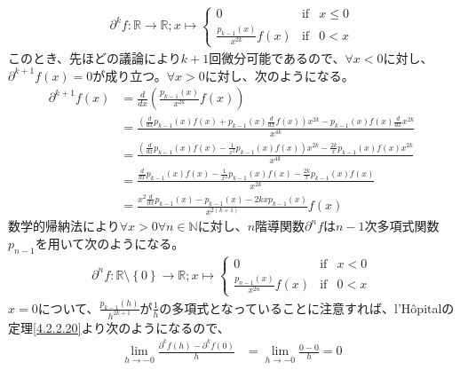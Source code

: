 \documentclass[dvipdfmx]{jsarticle}
\begin{document}
\begin{dfn}
{\begin{align*}
  \partial^k f:\mathbb{R} \rightarrow \mathbb{R} ; x \mapsto \left\{ \begin{matrix}
    0 & \mathrm{if} & x \leq 0 \\
    \frac{p_{k-1} \left(x \right) }{x^{2k }} f\left( x\right) & \mathrm{if} & 0 < x
  \end{matrix}\right. 
\end{align*}
このとき、先ほどの議論により$k+1$回微分可能であるので、$\forall x < 0 $に対し、$\partial^{k+1} f\left(x\right) =0 $が成り立つ。$\forall x >0 $に対し、次のようになる。
\begin{align*}
  \partial^{k+1} f \left(x\right) &= \frac{d}{dx} \left(\frac{p_{k-1} \left(x \right) }{x^{2k }} f\left( x\right) \right)\\
  &= \frac{\left(\frac{d}{dx} p_{k-1} \left(x\right) f\left(x\right) +p_{k-1} \left(x\right) \frac{d}{dx} f\left(x\right) \right) x^{2k} -p_{k-1} \left(x\right) f\left(x\right) \frac{d}{dx} x^{2k} }{x^{4k} } \\
  &= \frac{\left(\frac{d}{dx} p_{k-1} \left(x\right) f\left(x\right) -\frac{1}{x^2 } p_{k-1} \left(x\right) f\left(x\right) \right) x^{2k} -\frac{2k}{x} p_{k-1} \left(x\right) f\left(x\right) x^{2k} }{x^{4k} } \\
  &= \frac{\frac{d}{dx} p_{k-1} \left(x\right) f\left(x\right) -\frac{1}{x^2 } p_{k-1} \left(x\right) f\left(x\right) -\frac{2k}{x} p_{k-1} \left(x\right) f\left(x\right) }{x^{2k} } \\
  &= \frac{x^2 \frac{d}{dx} p_{k-1} \left(x\right) -p_{k-1} \left(x\right) -2kx p_{k-1} \left(x\right) }{x^{2(k+1)} } f\left(x\right)
\end{align*}
数学的帰納法により$\forall x>0 \forall n\in \mathbb{N} $に対し、$n$階導関数$\partial^n f$は$n-1$次多項式関数$p_{n-1} $を用いて次のようになる。
\begin{align*}
  \partial^n f:\mathbb{R}\setminus \left\{ 0\right\} \rightarrow \mathbb{R} ; x \mapsto \left\{ \begin{matrix}
    0 & \mathrm{if} & x < 0 \\
    \frac{p_{n-1} \left(x \right) }{x^{2n }} f\left( x\right) & \mathrm{if} & 0 < x
  \end{matrix}\right. 
\end{align*}
$x=0$について、$\frac{p_{k-1} \left(h\right) }{h^{2k+1}}$が$\frac{1}{h}$の多項式となっていることに注意すれば、l'Hôpitalの定理\ref{4.2.2.20}より次のようになるので、
\begin{align*}
  \lim_{h\rightarrow-0} \frac{\partial^k f\left( h\right) -\partial^k f\left( 0\right) }{h} &= \lim_{h\rightarrow-0} \frac{0-0}{h} =0 \\

\end{align*}}
\end{dfn}
\end{document}
